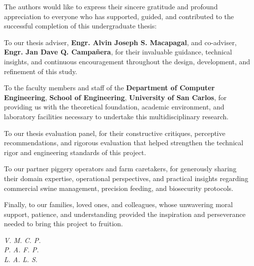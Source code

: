 
\begin{acknowledgments}      

The authors would like to express their sincere gratitude and profound appreciation to everyone who has supported, guided, and contributed to the successful completion of this undergraduate thesis:

To our thesis adviser, \textbf{Engr. Alvin Joseph S. Macapagal}, and co-adviser, \textbf{Engr. Jan Dave Q. Campa\~nera}, for their invaluable guidance, technical insights, and continuous encouragement throughout the design, development, and refinement of this study.

To the faculty members and staff of the \textbf{Department of Computer Engineering}, \textbf{School of Engineering}, \textbf{University of San Carlos}, for providing us with the theoretical foundation, academic environment, and laboratory facilities necessary to undertake this multidisciplinary research.

To our thesis evaluation panel, for their constructive critiques, perceptive recommendations, and rigorous evaluation that helped strengthen the technical rigor and engineering standards of this project.

To our partner piggery operators and farm caretakers, for generously sharing their domain expertise, operational perspectives, and practical insights regarding commercial swine management, precision feeding, and biosecurity protocols.

Finally, to our families, loved ones, and colleagues, whose unwavering moral support, patience, and understanding provided the inspiration and perseverance needed to bring this project to fruition.

\vspace{1.5cm}
\begin{flushright}
\textit{V. M. C. P.}\\
\textit{P. A. F. P.}\\
\textit{L. A. L. S.}
\end{flushright}

\end{acknowledgments}
